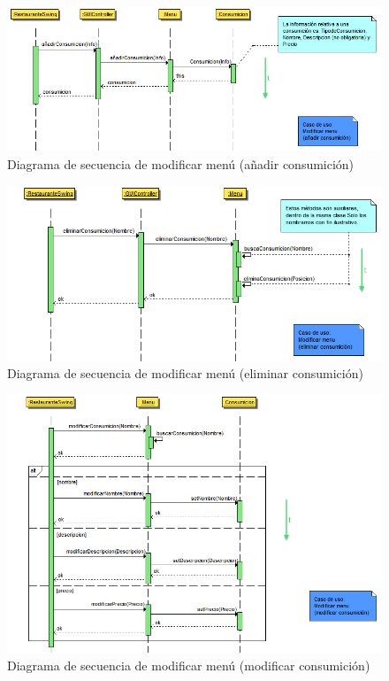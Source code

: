\documentclass[spanish,a4paper,11pt, twoside]{report}	%
\begin{document}
		\begin{figure}[!h]
		\centering
		\includegraphics[scale=0.5]{DSanyadirconsumicion.png}
		\caption{Diagrama de secuencia de modificar menú (añadir consumición)}
		\end{figure}

		\begin{figure}[!h]
		\centering
		\includegraphics[scale=0.5]{DSeliminarconsumicion.png}
		\caption{Diagrama de secuencia de modificar menú (eliminar consumición)}
		\end{figure}

		\begin{figure}[!h]
		\centering
		\includegraphics[scale=0.5]{DSmodificarconsumicion.png}
		\caption{Diagrama de secuencia de modificar menú (modificar consumición)}
		\end{figure}
\end{document}
